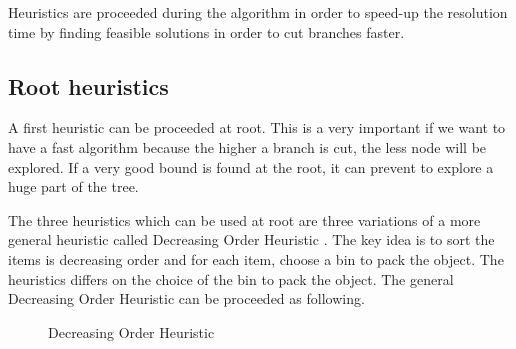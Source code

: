Heuristics are proceeded during the algorithm in order to speed-up the resolution time by finding feasible solutions in order to cut branches faster.

\subsection{Root heuristics}
\label{heuristic-root}

A first heuristic can be proceeded at root. This is a very important if we want to have a fast algorithm because the higher a branch is cut, the less node will be explored. If a very good bound is found at the root, it can prevent to explore a huge part of the tree.

The three heuristics which can be used at root are three variations of a more general heuristic called Decreasing Order Heuristic \cite{johnson1973near}. The key idea is to sort the items is decreasing order and for each item, choose a bin to pack the object. The heuristics differs on the choice of the bin to pack the object. The general Decreasing Order Heuristic can be proceeded as following.

\begin{figure}[!ht]
	\centering
	\begin{minipage}{0.5\linewidth}
		\begin{algorithm}[H]
			\DontPrintSemicolon 
			\SetAlgoLined
			\caption{Decreasing Order Heuristic}
		\end{algorithm}
	\end{minipage}
\end{figure}

